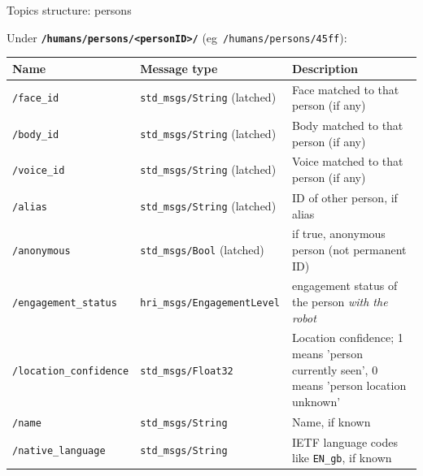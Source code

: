 \documentclass[xcolor=table,aspectratio=169]{beamer}
\begin{document}
\begin{frame}{Topics structure: persons}

    Under \textbf{\texttt{/humans/persons/<personID>/}} (eg~\texttt{/humans/persons/45ff}):

    \scriptsize
    \begin{tabular}{@{}p{3cm}p{4cm}p{6cm}@{}}
        \toprule
        \textbf{Name} & \textbf{Message type}         & \textbf{Description}                                                \\ \midrule
        \texttt{/face\_id            } & \texttt{std\_msgs/String} (latched) & Face matched to that person (if any)                                                    \\
        \texttt{/body\_id            } & \texttt{std\_msgs/String} (latched) & Body matched to that person (if any)                                                    \\
        \texttt{/voice\_id           } & \texttt{std\_msgs/String} (latched) & Voice matched to that person (if any)                                                   \\
        \texttt{/alias           } & \texttt{std\_msgs/String} (latched) & ID of other person, if alias                                                    \\
        \texttt{/anonymous           } & \texttt{std\_msgs/Bool} (latched) & if true, anonymous person (not permanent ID)   \\
        \texttt{/engagement\_status} & \texttt{hri\_msgs/EngagementLevel        }  & engagement status of the person \emph{with the robot} \\
        \texttt{/location\_confidence} & \texttt{std\_msgs/Float32        }  & Location confidence; 1 means 'person currently seen', 0 means 'person location unknown' \\
        \texttt{/name                } & \texttt{std\_msgs/String         }  & Name, if known                                                                          \\
        \texttt{/native\_language    } & \texttt{std\_msgs/String         }  & IETF language codes like \texttt{EN\_gb}, if known    \\
\bottomrule
\end{tabular}
    
\end{frame}
\end{document}
